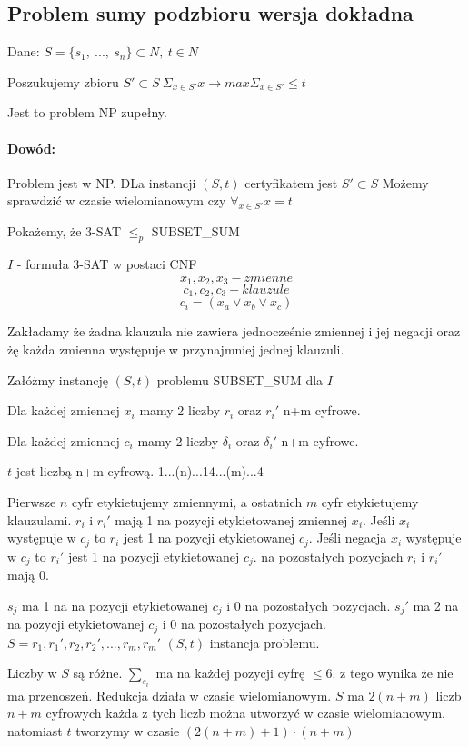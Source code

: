 \subsection{Problem sumy podzbioru wersja dokładna}
Dane: $S=\lbrace s_1,\ ...,\ s_n \rbrace \subset N,\ t\in N$

Poszukujemy zbioru $S'\subset S\ \Sigma_{x\in S'}x \rightarrow max\Sigma_{x\in S'}\leq t$

Jest to problem NP zupełny.

\paragraph{Dowód:}{Problem jest w NP. DLa instancji $(S,t)$ certyfikatem jest $S' \subset S$ Możemy sprawdzić w czasie wielomianowym czy $\forall_{x \in S'} x = t$}

Pokażemy, że 3-SAT $\leq_p$ SUBSET\_SUM 

$I$ - formuła 3-SAT w postaci CNF
$$ x_1, x_2, x_3 - zmienne$$
$$ c_1, c_2, c_3 - klauzule$$
$$ c_i = (x_a \lor x_b \lor x_c)$$

Zakładamy że żadna klauzula nie zawiera jednocześnie zmiennej i jej negacji oraz żę każda zmienna występuje w przynajmniej jednej klauzuli.

Załóżmy instancję $(S,t)$ problemu SUBSET\_SUM dla $I$

Dla każdej zmiennej $x_i$ mamy 2 liczby $r_i$ oraz $r_i'$ n+m cyfrowe.

Dla każdej zmiennej $c_i$ mamy 2 liczby $\delta_i$ oraz $\delta_i'$ n+m cyfrowe.

$t$ jest liczbą n+m cyfrową. 1...(n)...14...(m)...4

Pierwsze $n$ cyfr etykietujemy zmiennymi, a ostatnich $m$ cyfr etykietujemy klauzulami.
$r_i$ i $r_i'$ mają 1 na pozycji etykietowanej zmiennej $x_i$.
Jeśli $x_i$ występuje w $c_j$ to $r_i$ jest 1 na pozycji etykietowanej $c_j$.
Jeśli negacja $x_i$ występuje w $c_j$ to $r_i'$ jest 1 na pozycji etykietowanej $c_j$. na pozostałych pozycjach $r_i$ i $r_i'$ mają 0.

$s_j$ ma 1 na na pozycji etykietowanej $c_j$ i 0 na pozostałych pozycjach.
$s_j'$ ma 2 na na pozycji etykietowanej $c_j$ i 0 na pozostałych pozycjach.
$S = {r_1, r_1', r_2, r_2', ..., r_m,r_m'}$
$(S,t)$ instancja problemu.

Liczby w $S$ są różne. $\sum_{s_i}$ ma na każdej pozycji cyfrę $\leq 6$.
z tego wynika że nie ma przenoszeń.
Redukcja działa w czasie wielomianowym.
$S$ ma $2(n+m)$ liczb $n+m$ cyfrowych każda z tych liczb można utworzyć w czasie wielomianowym. natomiast $t$ tworzymy w czasie $(2(n+m)+1)\cdot(n+m)$

